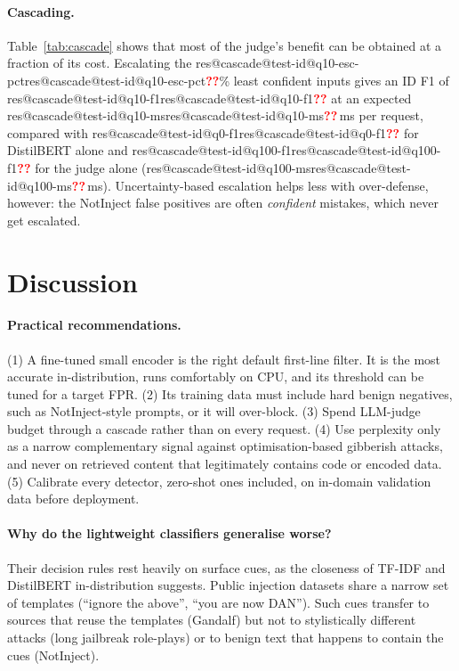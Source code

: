\documentclass[11pt]{article}
\makeatletter
\newif\ifdraft
\newcommand{\claim}[1]{\ifdraft{\color{blue!65!black}#1}\else#1\fi}
\newcommand{\res}[3]{\ifcsname res@#1@#2@#3\endcsname\csname res@#1@#2@#3\endcsname\else\textbf{\textcolor{red}{??}}\fi}
\makeatother
\begin{document}
\paragraph{Cascading.} Table~\ref{tab:cascade} shows that most of the judge's benefit can
be obtained at a fraction of its cost. \claim{Escalating the
\res{cascade}{test-id}{q10-esc-pct}\% least confident inputs gives an ID F1 of
\res{cascade}{test-id}{q10-f1} at an expected \res{cascade}{test-id}{q10-ms}\,ms per request,
compared with \res{cascade}{test-id}{q0-f1} for DistilBERT alone and
\res{cascade}{test-id}{q100-f1} for the judge alone (\res{cascade}{test-id}{q100-ms}\,ms).}
\claim{Uncertainty-based escalation helps less with over-defense, however: the NotInject
false positives are often \emph{confident} mistakes, which never get escalated.}

\section{Discussion}
\label{sec:discussion}

\paragraph{Practical recommendations.}
\claim{(1) A fine-tuned small encoder is the right default first-line filter. It is the
most accurate in-distribution, runs comfortably on CPU, and its threshold can be tuned
for a target FPR. (2) Its training data must include hard benign negatives, such as
NotInject-style prompts, or it will over-block. (3) Spend LLM-judge budget through a
cascade rather than on every request. (4) Use perplexity only as a narrow complementary
signal against optimisation-based gibberish attacks, and never on retrieved content that
legitimately contains code or encoded data. (5) Calibrate every detector, zero-shot ones
included, on in-domain validation data before deployment.}

\paragraph{Why do the lightweight classifiers generalise worse?}
\claim{Their decision rules rest heavily on surface cues, as the closeness of TF-IDF and
DistilBERT in-distribution suggests. Public injection datasets share a narrow set of
templates (``ignore the above'', ``you are now DAN''). Such cues transfer to sources that
reuse the templates (Gandalf) but not to stylistically different attacks (long
jailbreak role-plays) or to benign text that happens to contain the cues (NotInject).}
\end{document}

